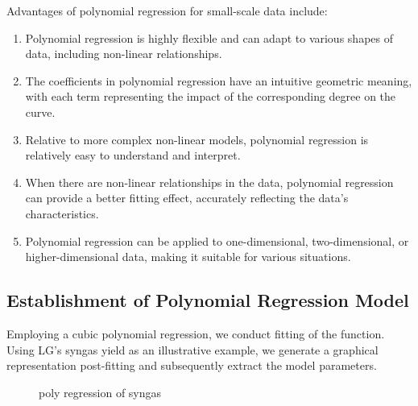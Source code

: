 \documentclass{swmcmthesis}
\begin{document}
Advantages of polynomial regression for small-scale data include:

\begin{enumerate}
    \item Polynomial regression is highly flexible and can adapt to various shapes of data, including non-linear relationships.
    \item The coefficients in polynomial regression have an intuitive geometric meaning, with each term representing the impact of the corresponding degree on the curve.
    \item Relative to more complex non-linear models, polynomial regression is relatively easy to understand and interpret.
    \item When there are non-linear relationships in the data, polynomial regression can provide a better fitting effect, accurately reflecting the data's characteristics.
    \item Polynomial regression can be applied to one-dimensional, two-dimensional, or higher-dimensional data, making it suitable for various situations.
\end{enumerate}

\subsection{Establishment of Polynomial Regression Model}

Employing a cubic polynomial regression, we conduct fitting of the function. Using LG's syngas yield as an illustrative example, we generate a graphical representation post-fitting and subsequently extract the model parameters.

\begin{figure}[h!t]
    \centering
    \hfill
    \caption{poly regression of syngas}
\end{figure}
\end{document}
